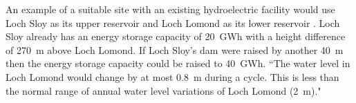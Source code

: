 An example of a suitable site with an existing hydroelectric facility would use Loch Sloy as its upper reservoir and Loch Lomond as its lower reservoir \citep{MacKayDavid2009, Strathclyde2004}.
Loch Sloy already has an energy storage capacity of 20~GWh with a height difference of 270~m above Loch Lomond.
If Loch Sloy's dam were raised by another 40~m then the energy storage capacity could be raised to 40~GWh.
``The water level in Loch Lomond would change by at most 0.8~m during a cycle.
This is less than the normal range of annual water level variations of Loch Lomond (2~m)." \citep[p.~193]{MacKayDavid2009}

\begin{comment}
\textbf{Loch Sloy}

``Loch Sloy was built to provide power for the Glasgow area to meet peak electricity demand.

``[\ldots]
As previous stated Loch Sloy Hydro Scheme was built in 1948 as a peak demand station for the Glasgow area. \hl{Being close to a major city and the grid it was decided to investigate the potential for conversion to Pumped Storage. The reason being that the top reservoir Loch Sloy exists, therefore no civil engineering costs would be incurred in new dam construction. Pumped storage requires that the turbine/pumps are below the minimum water level in the lower reservoir, in this case Loch Lomond. A new power station and tunnels would require to be excavated inside Ben Vorlich.} Research in the North of Scotland Hydro-Electric annual reports uncovered the original design criteria shown below.

``Output initially 120Mw

Output now 190Mw

Annual output 130Gw hours

Top dam storage capacity 15.5\% of gross annual output.

Annual output x percentage storage capacity/365 = daily storage capacity

``Answer 20.4 GWh pumped storage capacity"
\url{http://www.esru.strath.ac.uk/EandE/Web_sites/03-04/wind/content/storage%20available.html}

	``It is also to submit to Scottish Ministers an application for consent to develop a 60MW pumped storage scheme at its existing Sloy hydro electric power station at Loch Lomond, \hl{allowing it to produce an additional 100GWh (gigawatt hours) of electricity in a typical year to help meet peak demand}."
	\url{http://scotsrenewables.com/blog/distributionandstorage/pumped-storage-hydro-in-scotland/}
	

\end{comment}
